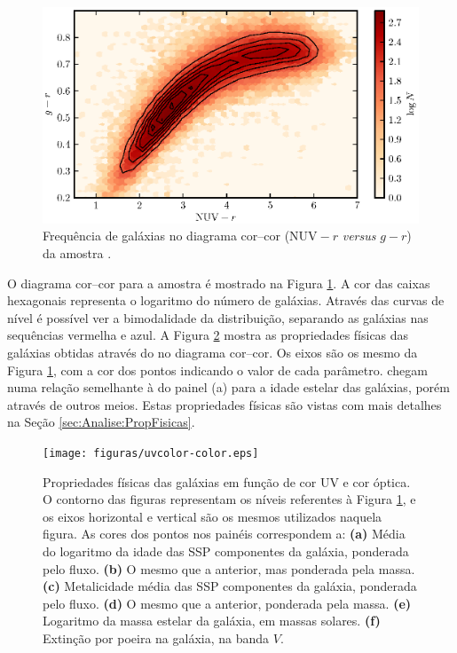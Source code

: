 \begin{figure}
	\includegraphics{figuras/uvcolor-color-density.eps}
	\caption[Frequência de galáxias no diagrama cor--cor.]
	{Frequência de galáxias no diagrama cor--cor ($\mathrm{NUV}-r$ {\em versus}
	$g-r$) da amostra \starlightUV.}
	\label{fig:DensityColor}
\end{figure}

O diagrama cor--cor para a amostra \starlightUV é mostrado na Figura
\ref{fig:DensityColor}. A cor das caixas hexagonais representa o logaritmo do
número de galáxias. Através das curvas de nível é possível ver a bimodalidade da
distribuição, separando as galáxias nas sequências vermelha e azul. A Figura
\ref{fig:ColorStarlightParam} mostra as propriedades físicas das galáxias
obtidas através do \starlight no diagrama cor--cor. Os eixos são os mesmo da
Figura \ref{fig:DensityColor}, com a cor dos pontos indicando o valor de cada
parâmetro. \citeauthor{Chilingarian2011} chegam numa relação semelhante à do
painel (a) para a idade estelar das galáxias, porém através de outros meios.
Estas propriedades físicas são vistas com mais detalhes na Seção
\ref{sec:Analise:PropFisicas}.

\begin{figure}
	\texttt{[image: figuras/uvcolor-color.eps]}
	\caption[Diagrama cor--cor para os diversos parâmetros \starlight.]
	{Propriedades físicas das galáxias em função de cor UV e cor óptica. O contorno
	das figuras representam os níveis referentes à Figura \ref{fig:DensityColor},
	e os eixos horizontal e vertical são os mesmos utilizados naquela figura. As
	cores dos pontos nos painéis correspondem a: \textbf{(a)} Média do logaritmo
	da idade das SSP componentes da galáxia, ponderada pelo fluxo. \textbf{(b)} O
	mesmo que a anterior, mas ponderada pela massa. \textbf{(c)} Metalicidade média
	das SSP componentes da galáxia, ponderada pelo fluxo. \textbf{(d)} O mesmo que
	a anterior, ponderada pela massa. \textbf{(e)} Logaritmo da massa estelar da
	galáxia, em massas solares. \textbf{(f)} Extinção por poeira na galáxia, na
	banda $V$.}
	\label{fig:ColorStarlightParam}
\end{figure}


